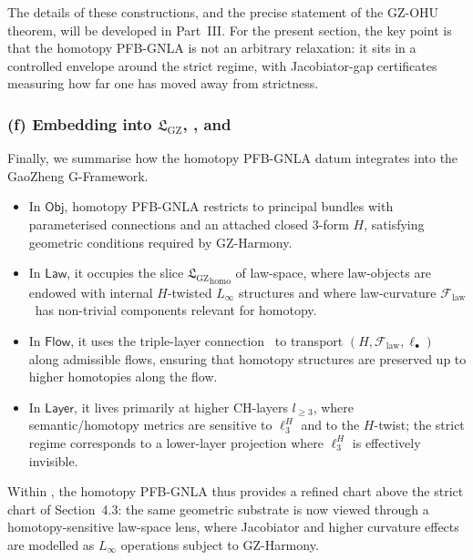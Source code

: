 \documentclass[11pt]{book}
\theoremstyle{plain}
\theoremstyle{definition}
\newcommand{\GZLS}{\ensuremath{\mathfrak{L}_{\mathrm{GZ}}}}       \newcommand{\GZLT}{\ensuremath{M_{!w}}}                           \newcommand{\GZLOC}{\ensuremath{A_M}}                             \newcommand{\GZLCurv}{\ensuremath{\mathcal{F}_{\mathrm{law}}}}
\begin{document}
The details of these constructions, and the precise statement of the
GZ-OHU theorem, will be developed in Part~III. For the present section,
the key point is that the homotopy PFB-GNLA is not an arbitrary
relaxation: it sits in a controlled envelope around the strict regime,
with Jacobiator-gap certificates measuring how far one has moved away
from strictness.



\subsubsection*{(f) Embedding into \texorpdfstring{\GZLS}{GZ-LS}, \texorpdfstring{\GZTLC}{GZ-TLC}, and \texorpdfstring{\GZGMS}{GZ-GMS}}

Finally, we summarise how the homotopy PFB-GNLA datum integrates into
the GaoZheng G-Framework.

\begin{itemize}
  \item In \textbf{$\mathsf{Obj}$}, homotopy PFB-GNLA restricts to
        principal bundles with parameterised connections and an
        attached closed 3-form $H$, satisfying geometric conditions
        required by GZ-Harmony.
  \item In \textbf{$\mathsf{Law}$}, it occupies the slice
        ${\GZLS}_{\mathrm{homo}}$ of law-space, where law-objects are
        endowed with internal $H$-twisted $L_\infty$ structures and
        where law-curvature \GZLCurv\ has non-trivial components
        relevant for homotopy.
  \item In \textbf{$\mathsf{Flow}$}, it uses the triple-layer
        connection \GZTLC\ to transport $(H,\GZLCurv,\ell_\bullet)$
        along admissible flows, ensuring that homotopy structures are
        preserved up to higher homotopies along the flow.
  \item In \textbf{$\mathsf{Layer}$}, it lives primarily at higher
        CH-layers $l_{\ge3}$, where semantic/homotopy metrics are
        sensitive to $\ell_3^H$ and to the $H$-twist; the strict regime
        corresponds to a lower-layer projection where $\ell_3^H$ is
        effectively invisible.
\end{itemize}

Within \GZGMS, the homotopy PFB-GNLA thus provides a refined chart
above the strict chart of Section~4.3: the same geometric substrate is
now viewed through a homotopy-sensitive law-space lens, where
Jacobiator and higher curvature effects are modelled as $L_\infty$
operations subject to GZ-Harmony.
\end{document}
